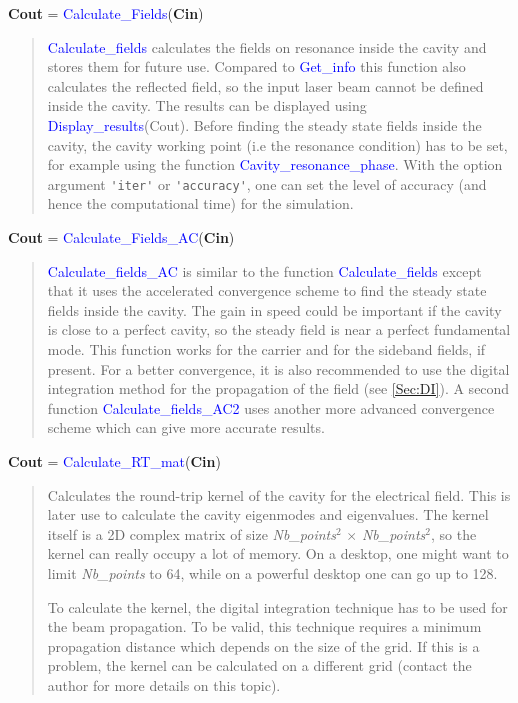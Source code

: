\noindent \textbf{Cout} = \textcolor{blue}{Calculate\_Fields}(\textbf{Cin})
\vspace*{-0.2cm}
\begin{quote}
\textcolor{blue}{Calculate\_fields} calculates the fields on resonance inside the cavity and stores them for future use. Compared to \textcolor{blue}{Get\_info} this function also calculates the reflected field, so the input laser beam cannot be defined inside the cavity. The results can be displayed using \textcolor{blue}{Display\_results}(Cout).
Before finding the steady state fields inside the cavity, the cavity working point (i.e the resonance condition) has to be set, for example using the function \textcolor{blue}{Cavity\_resonance\_phase}.
With the option argument \verb?'iter'? or \verb?'accuracy'?, one can set the level of accuracy (and hence the computational time) for the simulation.
\end{quote}

\noindent \textbf{Cout} = \textcolor{blue}{Calculate\_Fields\_AC}(\textbf{Cin})
\vspace*{-0.2cm}
\begin{quote}
\textcolor{blue}{Calculate\_fields\_AC} is similar to the function \textcolor{blue}{Calculate\_fields} except that it uses the accelerated convergence scheme \cite{Saha:97,DAY_AC} to find the steady state fields inside the cavity. The gain in speed could be important if the cavity is close to a perfect cavity, so the steady field is near a perfect fundamental mode.
This function works for the carrier and for the sideband fields, if present. For a better convergence, it is also recommended to use the digital integration method for the propagation of the field (see \ref{Sec:DI}).
A second function \textcolor{blue}{Calculate\_fields\_AC2} uses another more advanced convergence scheme which can give more accurate results.
\end{quote}

\noindent \textbf{Cout} = \textcolor{blue}{Calculate\_RT\_mat}(\textbf{Cin})
\vspace*{-0.2cm}
\begin{quote}
Calculates the round-trip kernel of the cavity for the electrical field. This is later use to calculate the cavity eigenmodes and eigenvalues. The kernel itself is a 2D complex matrix of size \textsl{Nb\_points}$^2$ $\times$ \textsl{Nb\_points}$^2$, so the kernel can really occupy a lot of memory. On a desktop, one might want to limit \textsl{Nb\_points} to 64, while on a powerful desktop one can go up to 128.

To calculate the kernel, the digital integration technique has to be used for the beam propagation. To be valid, this technique requires a minimum propagation distance which depends on the size of the grid. If this is a problem, the kernel can be calculated on a different grid (contact the author for more details on this topic).
\end{quote}

